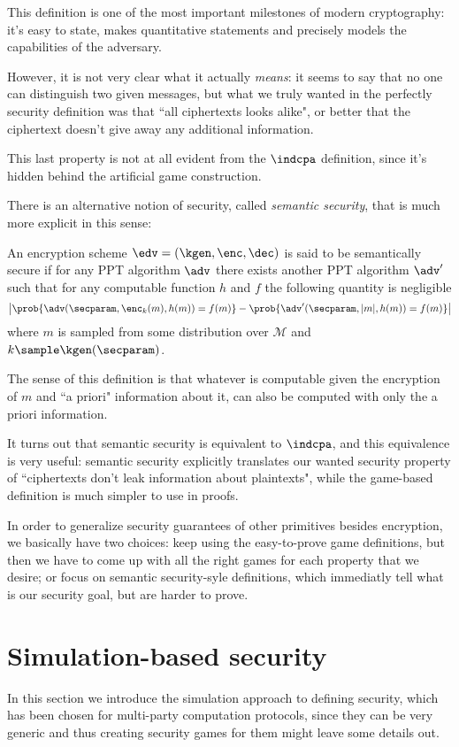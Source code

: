 This definition is one of the most important milestones of modern cryptography: it's easy to state, makes quantitative statements and precisely models the capabilities of the adversary.

However, it is not very clear what it actually \emph{means}: it seems to say that no one can distinguish two given messages, but what we truly wanted in the perfectly security definition was that ``all ciphertexts looks alike", or better that the ciphertext doesn't give away any additional information.

This last property is not at all evident from the $\indcpa$ definition, since it's hidden behind the artificial game construction.

There is an alternative notion of security, called \emph{semantic security}, that is much more explicit in this sense:
\begin{definition}
    An encryption scheme $\edv=(\kgen,\enc,\dec)$ is said to be semantically secure if for any PPT algorithm $\adv$ there exists another PPT algorithm $\adv'$ such that for any computable function $h$ and $f$ the following quantity is negligible
    $$\left| \prob{\adv(\secparam, \enc_k(m), h(m))=f(m)} - \prob{\adv'(\secparam, |m|, h(m))=f(m)}\right|$$
    where $m$ is sampled from some distribution over $\mathcal M$ and $k\sample\kgen(\secparam)$.
\end{definition}

The sense of this definition is that whatever is computable given the encryption of $m$ and ``a priori" information about it, can also be computed with only the a priori information.

It turns out that semantic security is equivalent to $\indcpa$, and this equivalence is very useful: semantic security explicitly translates our wanted security property of ``ciphertexts don't leak information about plaintexts", while the game-based definition is much simpler to use in proofs.

In order to generalize security guarantees of other primitives besides encryption, we basically have two choices: keep using the easy-to-prove game definitions, but then we have to come up with all the right games for each property that we desire; or focus on semantic security-syle definitions, which immediatly tell what is our security goal, but are harder to prove.

\section{Simulation-based security}
In this section we introduce the simulation approach to defining security, which has been chosen for multi-party computation protocols, since they can be very generic and thus creating security games for them might leave some details out.

